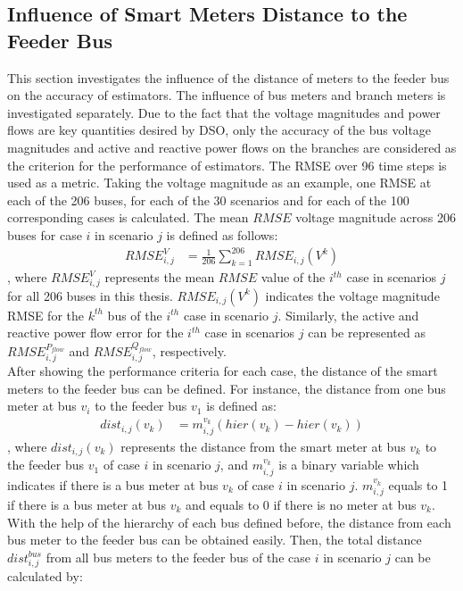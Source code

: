 \subsection{Influence of Smart Meters Distance to the Feeder Bus}
This section investigates the influence of the distance of meters to the feeder bus on the accuracy of estimators. The influence of bus meters and branch meters is investigated separately. Due to the fact that the voltage magnitudes and power flows are key quantities desired by DSO, only the accuracy of the bus voltage magnitudes and active and reactive power flows on the branches are considered as the criterion for the performance of estimators. The RMSE over 96 time steps is used as a metric. Taking the voltage magnitude as an example, one RMSE at each of the 206 buses, for each of the 30 scenarios and for each of the 100 corresponding cases is calculated. The mean $RMSE$ voltage magnitude across 206 buses for case $i$ in scenario $j$ is defined as follows:
\begin{align}
    RMSE^V_{i,j} &= \frac{1}{206} \sum_{k=1}^{206} RMSE_{i,j}(V^k)
    \label{eq:RMSE_V}
\end{align}
, where $RMSE^V_{i,j}$ represents the mean $RMSE$ value of the $i^{th}$ case in scenarios $j$ for all 206 buses in this thesis. $RMSE_{i,j}(V^k)$ indicates the voltage magnitude RMSE for the $k^{th}$ bus of the $i^{th}$ case in scenario $j$. Similarly, the active and reactive power flow error for the $i^{th}$ case in scenarios $j$ can be represented as $RMSE^{P_{flow}}_{i,j}$ and $RMSE^{Q_{flow}}_{i,j}$, respectively.
\bigskip
\\After showing the performance criteria for each case, the distance of the smart meters to the feeder bus can be defined. For instance, the distance from one bus meter at bus $v_i$ to the feeder bus $v_1$ is defined as:
\begin{align}
    dist_{i,j}(v_k) &= m^{v_k}_{i,j} ( hier(v_k) - hier(v_k) )
    \label{eq:dist_one_bus}
\end{align}
, where $dist_{i,j}(v_k)$ represents the distance from the smart meter at bus $v_k$ to the feeder bus $v_1$ of case $i$ in scenario $j$, and $m^{v_k}_{i,j}$ is a binary variable which indicates if there is a bus meter at bus $v_k$ of case $i$ in scenario $j$. $m^{v_k}_{i,j}$ equals to 1 if there is a bus meter at bus $v_k$ and equals to 0 if there is no meter at bus $v_k$. With the help of the hierarchy of each bus defined before, the distance from each bus meter to the feeder bus can be obtained easily. Then, the total distance $dist^{bus}_{i,j}$ from all bus meters to the feeder bus of the case $i$ in scenario $j$ can be calculated by:
